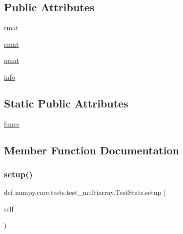 \subsection*{Public Attributes}
\begin{DoxyCompactItemize}
\item 
\hyperlink{classnumpy_1_1core_1_1tests_1_1test__multiarray_1_1TestStats_af2aac516d9130a5dafc1a63e979fd526}{rmat}
\item 
\hyperlink{classnumpy_1_1core_1_1tests_1_1test__multiarray_1_1TestStats_a866435e4eeeee59171d64f02516fdf25}{cmat}
\item 
\hyperlink{classnumpy_1_1core_1_1tests_1_1test__multiarray_1_1TestStats_a7cef2e8529f72252f871d3c6844c1896}{omat}
\item 
\hyperlink{classnumpy_1_1core_1_1tests_1_1test__multiarray_1_1TestStats_a8b4976304ee14375ff2f8237465b1233}{info}
\end{DoxyCompactItemize}
\subsection*{Static Public Attributes}
\begin{DoxyCompactItemize}
\item 
\hyperlink{classnumpy_1_1core_1_1tests_1_1test__multiarray_1_1TestStats_a06062626a041c5013d61281ec43c9b8a}{funcs}
\end{DoxyCompactItemize}


\subsection{Member Function Documentation}
\mbox{\label{classnumpy_1_1core_1_1tests_1_1test__multiarray_1_1TestStats_ab069d515eedd6a65b237f09348131e82}} 
\subsubsection{\texorpdfstring{setup()}{setup()}}
{\footnotesize\ttfamily def numpy.\+core.\+tests.\+test\+\_\+multiarray.\+Test\+Stats.\+setup (\begin{DoxyParamCaption}\item[{}]{self }\end{DoxyParamCaption})}

